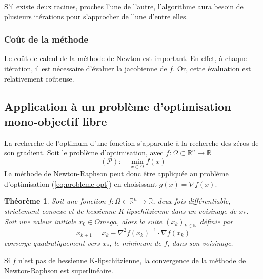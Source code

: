 \documentclass[3p, twocolumn]{elsarticle}
\newtheorem{thm}{Théorème}
\begin{document}
\begin{rmk}
S'il existe deux racines, proches l'une de l'autre, l'algorithme aura besoin de plusieurs itérations pour s'approcher de l'une d'entre elles.
\end{rmk}

\subsubsection{Coût de la méthode}
Le coût de calcul de la méthode de Newton est important. En effet, à chaque itération, il est nécessaire d’évaluer la jacobienne de $f$. Or, cette évaluation est relativement coûteuse.

\subsection{Application à un problème d'optimisation mono-objectif libre}
La recherche de l'optimum d'une fonction s'apparente à la recherche des zéros de son gradient.
Soit le problème d'optimisation, avec $f:\Omega \subset \mathbb{R}^n \rightarrow \mathbb{R}$
\begin{equation}
    (\mathscr{P}):\quad\min_{x\in \Omega} f(x)
    \label{eq:probleme-opt}
\end{equation}
La méthode de Newton-Raphson peut donc être appliquée au problème d'optimisation (\ref{eq:probleme-opt}) en choisissant $g(x)=\nabla f(x)$.
\begin{thm}
    Soit une fonction $f:\Omega \in \mathbb{R}^n\rightarrow \mathbb{R}$, deux fois différentiable, strictement convexe et de hessienne K-lipschitzienne dans un voisinage de $x_*$. Soit une valeur initiale $x_0\in Omega$, alors la suite $(x_k)_{k\in \mathbb{N}}$ définie par
    \begin{equation}
        x_{k+1}=x_k-\nabla^{2}f(x_k)^{-1}\cdot \nabla f(x_k)
        \label{eq:nr-opt-mono}
    \end{equation}
    converge quadratiquement vers $x_*$, le minimum de $f$, dans son voisinage.
\end{thm}

\begin{rmk}
    Si $f$ n'est pas de hessienne K-lipschitzienne, la convergence de la méthode de Newton-Raphson est superlinéaire.
\end{rmk}
\end{document}
